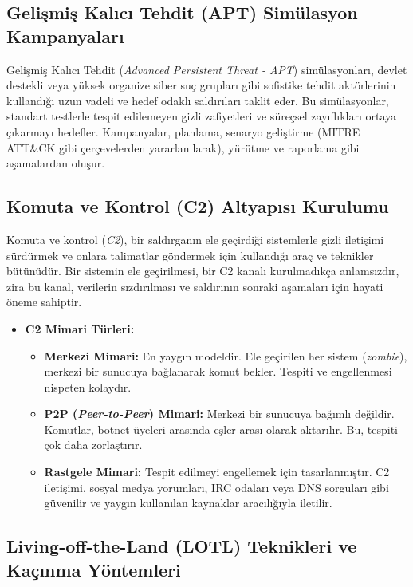 \subsection{Gelişmiş Kalıcı Tehdit (APT) Simülasyon Kampanyaları}

Gelişmiş Kalıcı Tehdit (\textit{Advanced Persistent Threat - APT}) simülasyonları, devlet destekli veya yüksek organize siber suç grupları gibi sofistike tehdit aktörlerinin kullandığı uzun vadeli ve hedef odaklı saldırıları taklit eder. Bu simülasyonlar, standart testlerle tespit edilemeyen gizli zafiyetleri ve süreçsel zayıflıkları ortaya çıkarmayı hedefler. Kampanyalar, planlama, senaryo geliştirme (MITRE ATT\&CK gibi çerçevelerden yararlanılarak), yürütme ve raporlama gibi aşamalardan oluşur.

\subsection{Komuta ve Kontrol (C2) Altyapısı Kurulumu}

Komuta ve kontrol (\textit{C2}), bir saldırganın ele geçirdiği sistemlerle gizli iletişimi sürdürmek ve onlara talimatlar göndermek için kullandığı araç ve teknikler bütünüdür. Bir sistemin ele geçirilmesi, bir C2 kanalı kurulmadıkça anlamsızdır, zira bu kanal, verilerin sızdırılması ve saldırının sonraki aşamaları için hayati öneme sahiptir.

\begin{itemize}
\item \textbf{C2 Mimari Türleri:}
\begin{itemize}
\item \textbf{Merkezi Mimari:} En yaygın modeldir. Ele geçirilen her sistem (\textit{zombie}), merkezi bir sunucuya bağlanarak komut bekler. Tespiti ve engellenmesi nispeten kolaydır.
\item \textbf{P2P (\textit{Peer-to-Peer}) Mimari:} Merkezi bir sunucuya bağımlı değildir. Komutlar, botnet üyeleri arasında eşler arası olarak aktarılır. Bu, tespiti çok daha zorlaştırır.
\item \textbf{Rastgele Mimari:} Tespit edilmeyi engellemek için tasarlanmıştır. C2 iletişimi, sosyal medya yorumları, IRC odaları veya DNS sorguları gibi güvenilir ve yaygın kullanılan kaynaklar aracılığıyla iletilir.
\end{itemize}
\end{itemize}

\subsection{Living-off-the-Land (LOTL) Teknikleri ve Kaçınma Yöntemleri}

